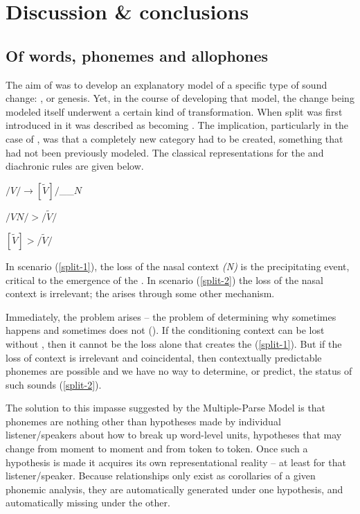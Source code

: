 \chapter{Discussion \& conclusions}\label{ch:Summary}\largerpage[2]
\section{Of words, phonemes and allophones}
The aim of  was to develop an explanatory
model of a specific type of sound change: , or 
genesis. Yet, in the course of developing that model, the change being
modeled itself underwent a certain kind of transformation. When 
split was first introduced in  it was
described as  becoming . The implication, particularly
in the case of , was that a completely new 
category had to be created, something that had not been previously
modeled. The classical representations for the  and diachronic
rules are given below.
\begin{covexample}
\label{allophonic rule}$/V/\rightarrow[\tilde{V}]/$\_\_$N$
\end{covexample}
\begin{covsubexamples}
\item \label{split-1}$/VN/>/\tilde{V}/$
\item \label{split-2}$[\tilde{V}]>/\tilde{V}/$
\end{covsubexamples}
In scenario (\ref{split-1}), the loss of the nasal context \emph{(N)}
is the precipitating event, critical to the emergence of the .
In scenario (\ref{split-2}) the loss of the nasal context is irrelevant;
the  arises through some other mechanism.

Immediately, the  problem arises – the problem of determining
why  sometimes happens and sometimes does not (\citealt{Labov1968}).
If the conditioning context can be lost without , then
it cannot be the loss alone that creates the  (\ref{split-1}).
But if the loss of context is irrelevant and coincidental, then contextually
predictable phonemes are possible and we have no way to determine, or predict, the status of such sounds (\ref{split-2}).

The solution to this impasse suggested by the Multiple-Parse
Model is that phonemes are nothing other than hypotheses made by individual
listener/speakers about how to break up word-level units, hypotheses
that may change from moment to moment and from token to token. Once
such a hypothesis is made it acquires its own representational reality
– at least for that listener/speaker. Because  relationships only
exist as corollaries of a given phonemic analysis, they are automatically
generated under one hypothesis, and automatically missing under the
other. 

